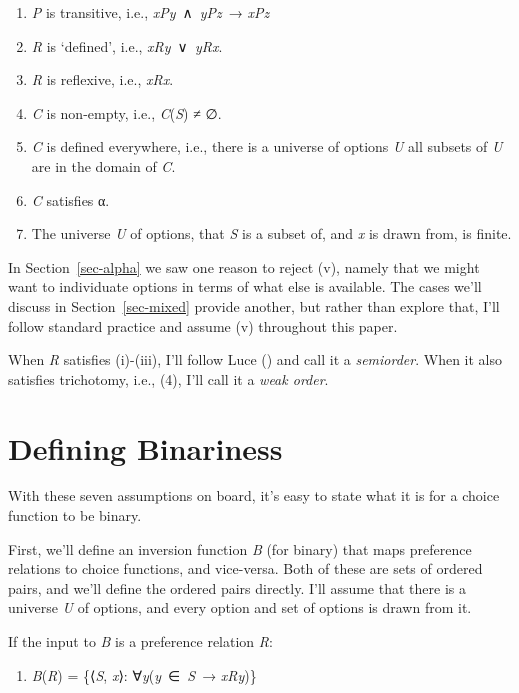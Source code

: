 \documentclass[
  11pt,
  letterpaper,
  DIV=11,
  numbers=noendperiod,
  twoside]{scrartcl}
\providecommand{\tightlist}{%
  \setlength{\itemsep}{0pt}\setlength{\parskip}{0pt}}
\begin{document}
\begin{enumerate}
\def\labelenumi{(\roman{enumi})}
\tightlist
\item
  \emph{P} is transitive, i.e., \emph{xPy}~∧~\emph{yPz}~→ \emph{xPz}
\item
  \emph{R} is `defined', i.e., \emph{xRy}~∨~\emph{yRx}.
\item
  \emph{R} is reflexive, i.e., \emph{xRx}.
\item
  \emph{C} is non-empty, i.e., \emph{C}(\emph{S}) ≠ ∅.
\item
  \emph{C} is defined everywhere, i.e., there is a universe of options
  \emph{U} all subsets of \emph{U} are in the domain of \emph{C}.
\item
  \emph{C} satisfies α.
\item
  The universe \emph{U} of options, that \emph{S} is a subset of, and
  \emph{x} is drawn from, is finite.
\end{enumerate}

In Section~\ref{sec-alpha} we saw one reason to reject (v), namely that
we might want to individuate options in terms of what else is available.
The cases we'll discuss in Section~\ref{sec-mixed} provide another, but
rather than explore that, I'll follow standard practice and assume (v)
throughout this paper.

When \emph{R} satisfies (i)-(iii), I'll follow Luce
() and call it a \emph{semiorder}. When it
also satisfies trichotomy, i.e., (4), I'll call it a \emph{weak order}.

\section{Defining Binariness}\label{sec-defining}

With these seven assumptions on board, it's easy to state what it is for
a choice function to be binary.

First, we'll define an inversion function \emph{B} (for binary) that
maps preference relations to choice functions, and vice-versa. Both of
these are sets of ordered pairs, and we'll define the ordered pairs
directly. I'll assume that there is a universe \emph{U} of options, and
every option and set of options is drawn from it.

If the input to \emph{B} is a preference relation \emph{R}:

\begin{enumerate}
\def\labelenumi{(\arabic{enumi})}
\setcounter{enumi}{6}
\tightlist
\item
  \emph{B}(\emph{R}) = \{⟨\emph{S}, \emph{x}⟩:
  ∀\emph{y}(\emph{y}~∈~\emph{S}~→ \emph{xRy})\}
\end{enumerate}
\end{document}
